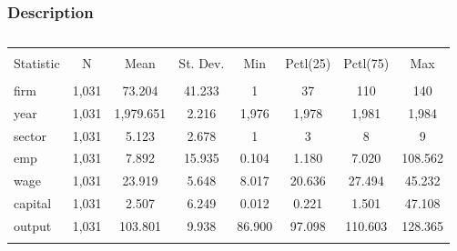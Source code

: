 \documentclass{beamer}
\newcommand{\1}{\mathbb{1}}
\begin{document}
\begin{frame}\frametitle{Description}
\begin{table}[!htbp] \centering 
\footnotesize
  \caption{} 
  \label{} 
\begin{tabular}{lccccccc} 
\\[-1.8ex]\hline 
\hline \\[-1.8ex] 
Statistic & \multicolumn{1}{c}{N} & \multicolumn{1}{c}{Mean} & \multicolumn{1}{c}{St. Dev.} & \multicolumn{1}{c}{Min} & \multicolumn{1}{c}{Pctl(25)} & \multicolumn{1}{c}{Pctl(75)} & \multicolumn{1}{c}{Max} \\ 
\hline \\[-1.8ex] 
firm & 1,031 & 73.204 & 41.233 & 1 & 37 & 110 & 140 \\ 
year & 1,031 & 1,979.651 & 2.216 & 1,976 & 1,978 & 1,981 & 1,984 \\ 
sector & 1,031 & 5.123 & 2.678 & 1 & 3 & 8 & 9 \\ 
emp & 1,031 & 7.892 & 15.935 & 0.104 & 1.180 & 7.020 & 108.562 \\ 
wage & 1,031 & 23.919 & 5.648 & 8.017 & 20.636 & 27.494 & 45.232 \\ 
capital & 1,031 & 2.507 & 6.249 & 0.012 & 0.221 & 1.501 & 47.108 \\ 
output & 1,031 & 103.801 & 9.938 & 86.900 & 97.098 & 110.603 & 128.365 \\ 
\hline \\[-1.8ex] 
\end{tabular} 
\end{table} 
\end{frame}
\end{document}
